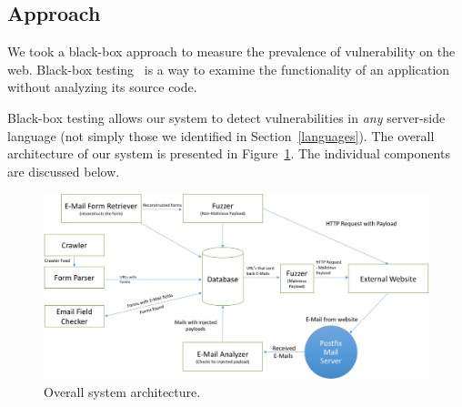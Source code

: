 \subsection{Approach}
\label{sys:appr}
We took a black-box approach to measure the prevalence of \ehi vulnerability on the web. Black-box testing~\cite{Beizer:1995:BTT:202699} is a way to examine the functionality of an application without analyzing its source code.

Black-box testing allows our system to detect \ehi vulnerabilities in \emph{any} server-side language (not simply those we identified in Section~\ref{languages}). The overall architecture of our system is presented in Figure~\ref{fig:overall}. The individual components are discussed below.

\begin{figure}
	\centering
	\includegraphics[width=.5\textwidth]{overall_crop}
	\caption{Overall system architecture.}
	\label{fig:overall}
\end{figure}
